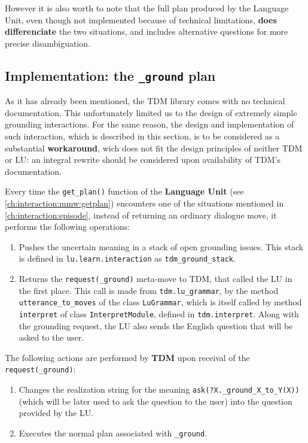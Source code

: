 However it is also worth to note that the full plan produced by the Language Unit, even though not implemented because of technical limitations, \textbf{does differenciate} the two situations, and includes alternative questions for more precise disambiguation.

\subsection{Implementation: the \texttt{\_ground} plan} \label{ch:interaction:episode:impl}

As it has already been mentioned, the TDM library comes with no technical documentation. This unfortunately limited us to the design of extremely simple grounding interactions. For the same reason, the design and implementation of such interaction, which is described in this section, is to be considered as a substantial \textbf{workaround}, wich does not fit the design principles of neither TDM or LU: an integral rewrite should be considered upon availability of TDM's documentation.

Every time the \texttt{get\_plan()} function of the \textbf{Language Unit} (see \ref{ch:interaction:mmw:getplan}) encounters one of the situations mentioned in \ref{ch:interaction:episode}, instead of returning an ordinary dialogue move, it performs the following operations: 
\begin{enumerate}
	\item Pushes the uncertain meaning in a stack of open grounding issues. This stack is defined in \texttt{lu.learn.interaction} as \texttt{tdm\_ground\_stack}.
	\item Returns the \texttt{request(\_ground)} meta-move to TDM, that called the LU in the first place. This call is made from \texttt{tdm.lu\_grammar}, by the method \texttt{utterance\_to\_moves} of the class \texttt{LuGrammar}, which is itself called by method \texttt{interpret} of class \texttt{InterpretModule}, defined in \texttt{tdm.interpret}. Along with the grounding request, the LU also sends the English question that will be asked to the user.
\end{enumerate}

The following actions are performed by \textbf{TDM} upon receival of the \texttt{request(\_ground)}:
\begin{enumerate}
	\item Changes the realization string for the meaning \texttt{ask(?X.\_ground\_X\_to\_Y(X))} (which will be later used to ask the question to the user)  into the question provided by the LU.
	\item Executes the normal plan associated with  \texttt{\_ground}.
\end{enumerate}

